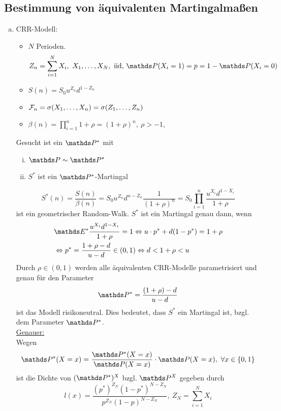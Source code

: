 
\subsection{Bestimmung von äquivalenten Martingalmaßen}
\label{sub:bestimmung_mmase}
\begin{enumerate}[(a)]
	\item CRR-Modell:
	\begin{itemize}
		\item $N$ Perioden.
		\[
		Z_n=\sum_{i=1}^{N}X_i,~X_1,\dots,X_N,\text{ iid, }\Pw(X_i=1)=p=1-\Pw(X_i=0)
		\]
		\item $S(n)=S_0u^{Z_n}d^{1-Z_n}$
		\item $\mathcal{F}_n=\sigma(X_1,\dots,X_n)=\sigma(Z_1,\dots,Z_n)$
		\item $\beta(n)=\prod_{i=1}^{n}1+\rho=(1+\rho)^n,~\rho>-1$,
	\end{itemize}
	Gesucht ist ein $\Pw^*$ mit 
	\begin{enumerate}[(i)]
		\item $\Pw \sim \Pw^*$
		\item $S^*$ ist ein $\Pw^*$-Martingal
	\end{enumerate}
	\[
	S^*(n)=\frac{S(n)}{\beta(n)}=S_0u^{Z_n}d^{n-Z_n}\frac{1}{(1+\rho)^n}=S_0\prod_{i=1}^{n}\frac{u^{X_i}d^{1-X_i}}{1+\rho}
	\]
	ist ein geometrischer Random-Walk.
	$S^*$ ist ein Martingal genau dann, wenn
	\begin{equation*}
	\begin{aligned}
		&\E^*\frac{u^{X_i}d^{1-X_i}}{1+\rho}=1 \Leftrightarrow u\cdot p^*+d(1-p^*)=1+\rho\\
		&\Leftrightarrow p^*=\frac{1+\rho-d}{u-d}\in (0,1) \Leftrightarrow d<1+\rho<u
	\end{aligned}
	\end{equation*}
	Durch $\rho\in(0,1)$ werden alle äquivalenten CRR-Modelle parametrisiert und genau für den Parameter
	\[
	\Pw^*=\frac{(1+\rho)-d}{u-d}
	\]
	ist das Modell risikoneutral.
	Dies bedeutet, dass $S^*$ ein Martingal ist, bzgl. dem Parameter $\Pw^*$.\\
	\uline{Genauer:}\\
	Wegen 
	\[
	\Pw^*(X=x)=\frac{\Pw^*(X=x)}{\Pw(X=x)}\cdot \Pw(X=x),~\forall x\in \{0,1\}
	\]
	ist die Dichte von $(\Pw^*)^X$ bzgl. $\Pw^X$ gegeben durch
	\[
	l(x)=\frac{(p^*)^{Z_N}(1-p^*)^{N-Z_N}}{p^{Z_N}(1-p)^{N-Z_N}},~Z_N=\sum_{i=1}^{N}X_i
\]
\end{enumerate}
